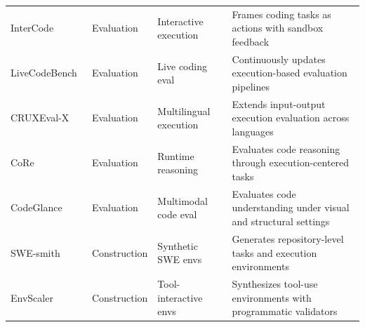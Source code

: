 \begin{table}[t]
\begin{tabularx}{\textwidth}{p{2.8cm}p{2.0cm}p{3.1cm}X}
InterCode~\cite{yang2023intercode} & Evaluation & Interactive execution & Frames coding tasks as actions with sandbox feedback \\
LiveCodeBench~\cite{jain2024livecodebench} & Evaluation & Live coding eval & Continuously updates execution-based evaluation pipelines \\
CRUXEval-X~\cite{xu2025cruxeval} & Evaluation & Multilingual execution & Extends input-output execution evaluation across languages \\
CoRe~\cite{xie2025core} & Evaluation & Runtime reasoning & Evaluates code reasoning through execution-centered tasks \\
CodeGlance~\cite{wang2026codeglance} & Evaluation & Multimodal code eval & Evaluates code understanding under visual and structural settings \\
SWE-smith~\cite{yang2025swesmithscalingdatasoftware} & Construction & Synthetic SWE envs & Generates repository-level tasks and execution environments \\
EnvScaler~\cite{song2026envscalerscalingtoolinteractiveenvironments} & Construction & Tool-interactive envs & Synthesizes tool-use environments with programmatic validators \\
\bottomrule
\end{tabularx}
\label{tab:code_environment_systems}
\end{table}



